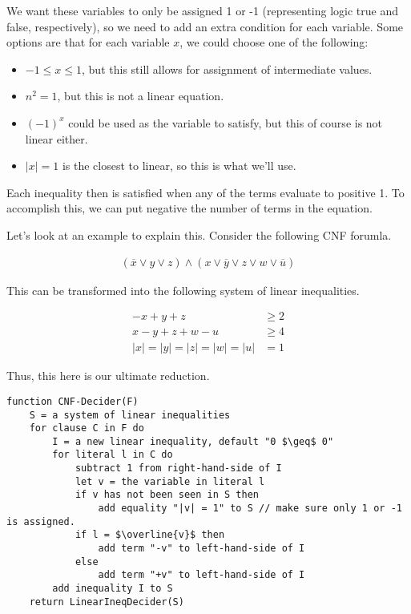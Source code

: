 \documentclass{article}
\begin{document}
We want these variables to only be assigned 1 or -1 (representing logic true and false, respectively), so we need to add an extra condition for each variable.
Some options are that for each variable $x$, we could choose one of the following:
\begin{itemize}
  \item $-1 \leq x \leq 1$, but this still allows for assignment of intermediate values.
  \item $n^2 = 1$, but this is not a linear equation.
  \item $(-1)^x$ could be used as the variable to satisfy, but this of course is not linear either.
  \item $|x| = 1$ is the closest to linear, so this is what we'll use.
\end{itemize}

Each inequality then is satisfied when any of the terms evaluate to positive 1.
To accomplish this, we can put negative the number of terms in the equation.

Let's look at an example to explain this.
Consider the following CNF forumla.

\begin{align*}
    (\overline{x} \lor y \lor z) \land (x \lor \overline{y} \lor z \lor w \lor \overline{u})
\end{align*}

This can be transformed into the following system of linear inequalities.

\begin{align*}
    -x + y + z &\geq 2\\
    x - y + z + w -u &\geq 4\\
    |x| = |y| = |z| = |w| = |u| &= 1
\end{align*}

Thus, this here is our ultimate reduction.

\begin{lstlisting}
function CNF-Decider(F)
    S = a system of linear inequalities
    for clause C in F do
        I = a new linear inequality, default "0 $\geq$ 0"
        for literal l in C do
            subtract 1 from right-hand-side of I
            let v = the variable in literal l
            if v has not been seen in S then
                add equality "|v| = 1" to S // make sure only 1 or -1 is assigned.
            if l = $\overline{v}$ then
                add term "-v" to left-hand-side of I
            else
                add term "+v" to left-hand-side of I
        add inequality I to S
    return LinearIneqDecider(S)
\end{lstlisting}
\end{document}
